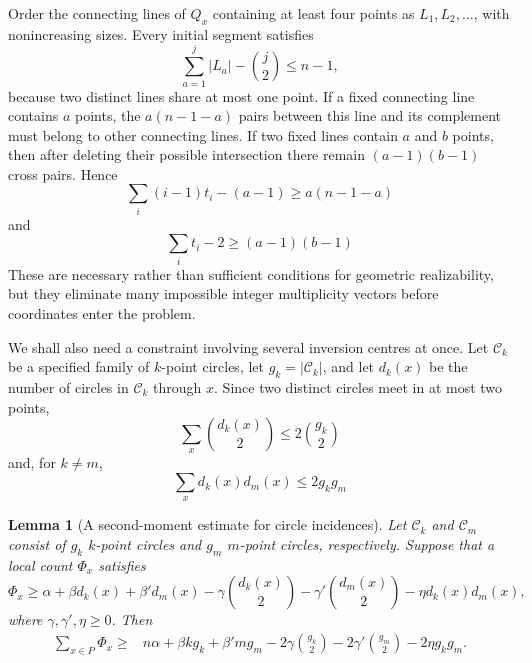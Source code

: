 \documentclass[11pt,a4paper]{article}
\newtheorem{lemma}[theorem]{Lemma}
\theoremstyle{definition}
\begin{document}
Order the connecting lines of $Q_x$ containing at least four points as
$L_1,L_2,\ldots$, with nonincreasing sizes.  Every initial segment satisfies
\begin{equation}\label{eq:prefix-en}
\sum_{a=1}^j|L_a|-\binom j2\le n-1,
\end{equation}
because two distinct lines share at most one point.  If a fixed connecting line
contains $a$ points, the $a(n-1-a)$ pairs between this line and its complement must
belong to other connecting lines.  If two fixed lines contain $a$ and $b$ points,
then after deleting their possible intersection there remain $(a-1)(b-1)$ cross
pairs.  Hence
\begin{equation}\label{eq:oneline-en}
\sum_i(i-1)t_i-(a-1)\ge a(n-1-a)
\end{equation}
and
\begin{equation}\label{eq:twoline-en}
\sum_it_i-2\ge(a-1)(b-1)
\end{equation}
These are necessary rather than sufficient conditions for geometric realizability,
but they eliminate many impossible integer multiplicity vectors before coordinates
enter the problem.

We shall also need a constraint involving several inversion centres at once.  Let
$\mathcal C_k$ be a specified family of $k$-point circles, let
$g_k=|\mathcal C_k|$, and let $d_k(x)$ be the number of circles in $\mathcal C_k$
through $x$.  Since two distinct circles meet in at most two points,
\begin{equation}\label{eq:same-en}
\sum_x\binom{d_k(x)}2\le2\binom{g_k}{2}
\end{equation}
and, for $k\ne m$,
\begin{equation}\label{eq:cross-en}
\sum_xd_k(x)d_m(x)\le2g_kg_m
\end{equation}

\begin{lemma}[A second-moment estimate for circle incidences]
\label{lem:moment-en}
Let $\mathcal C_k$ and $\mathcal C_m$ consist of $g_k$ $k$-point circles and
$g_m$ $m$-point circles, respectively.  Suppose that a local count $\Phi_x$ satisfies
\[
\Phi_x\ge \alpha+\beta d_k(x)+\beta'd_m(x)
-\gamma\binom{d_k(x)}2-\gamma'\binom{d_m(x)}2
-\eta d_k(x)d_m(x),
\]
where $\gamma,\gamma',\eta\ge0$.  Then
\begin{align}
\sum_{x\in P}\Phi_x\ge{}&n\alpha+\beta k g_k+\beta'mg_m
-2\gamma\binom{g_k}{2}-2\gamma'\binom{g_m}{2}
-2\eta g_kg_m. \label{eq:moment-en}
\end{align}
\end{lemma}
\end{document}
